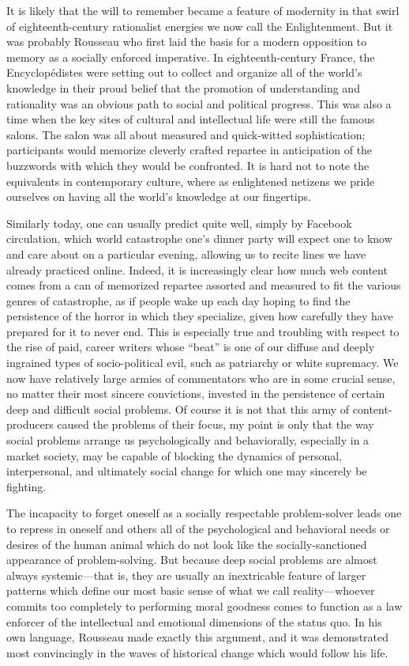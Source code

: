 \documentclass[a4paper,12pt,margin=.5in]{article}
\begin{document}
It is likely that the will to remember became a feature of modernity in
that swirl of eighteenth-century rationalist energies we now call the
Enlightenment. But it was probably Rousseau who first laid the basis for
a modern opposition to memory as a socially enforced imperative. In
eighteenth-century France, the Encyclopédistes were setting out to
collect and organize all of the world's knowledge in their proud belief
that the promotion of understanding and rationality was an obvious path
to social and political progress. This was also a time when the key
sites of cultural and intellectual life were still the famous salons.
The salon was all about measured and quick-witted sophistication;
participants would memorize cleverly crafted repartee in anticipation of
the buzzwords with which they would be confronted. It is hard not to
note the equivalents in contemporary culture, where as enlightened
netizens we pride ourselves on having all the world's knowledge at our
fingertips.

Similarly today, one can usually predict quite well, simply by Facebook
circulation, which world catastrophe one's dinner party will expect one
to know and care about on a particular evening, allowing us to recite
lines we have already practiced online. Indeed, it is increasingly clear
how much web content comes from a can of memorized repartee assorted and
measured to fit the various genres of catastrophe, as if people wake up
each day hoping to find the persistence of the horror in which they
specialize, given how carefully they have prepared for it to never end.
This is especially true and troubling with respect to the rise of paid,
career writers whose ``beat'' is one of our diffuse and deeply ingrained
types of socio-political evil, such as patriarchy or white supremacy. We
now have relatively large armies of commentators who are in some crucial
sense, no matter their most sincere convictions, invested in the
persistence of certain deep and difficult social problems. Of course it
is not that this army of content-producers caused the problems of their
focus, my point is only that the way social problems arrange us
psychologically and behaviorally, especially in a market society, may be
capable of blocking the dynamics of personal, interpersonal, and
ultimately social change for which one may sincerely be fighting.

The incapacity to forget oneself as a socially respectable
problem-solver leads one to repress in oneself and others all of the
psychological and behavioral needs or desires of the human animal which
do not look like the socially-sanctioned appearance of problem-solving.
But because deep social problems are almost always systemic---that is,
they are usually an inextricable feature of larger patterns which define
our most basic sense of what we call reality---whoever commits too
completely to performing moral goodness comes to function as a law
enforcer of the intellectual and emotional dimensions of the status quo.
In his own language, Rousseau made exactly this argument, and it was
demonstrated most convincingly in the waves of historical change which
would follow his life.
\end{document}
